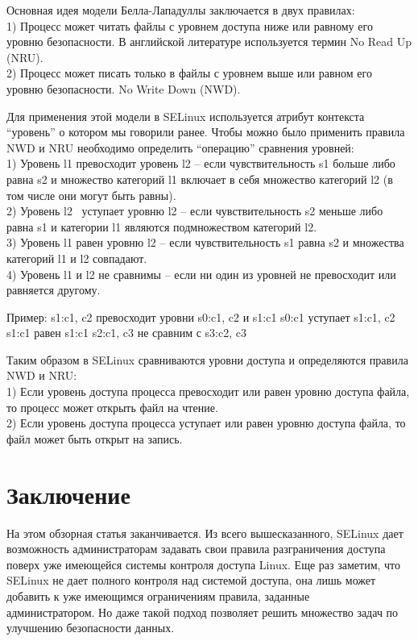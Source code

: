\documentclass{article}
\begin{document}
Основная идея модели Белла-Лападуллы заключается в двух правилах:\\
1) Процесс может читать файлы с уровнем доступа ниже или равному его уровню безопасности. В английской литературе используется термин No Read Up (NRU).\\
2) Процесс может писать только в файлы с уровнем выше или равном его уровню безопасности. No Write Down (NWD).

Для применения этой модели в SELinux используется атрибут контекста “уровень” о котором мы говорили ранее. Чтобы можно было применить правила NWD и NRU необходимо определить “операцию” сравнения уровней:\\
1) Уровень l1 превосходит уровень l2 – если чувствительность s1 больше либо равна s2 и множество категорий l1 включает в себя множество категорий l2 (в том числе они могут быть равны).\\
2) Уровень l2  уступает уровню l2 – если чувствительность s2 меньше либо равна s1 и категории l1 являются подмножеством категорий l2.\\
3) Уровень l1 равен уровню l2 – если чувствительность s1 равна s2 и множества категорий l1 и l2 совпадают.\\
4) Уровень l1 и l2 не сравнимы – если ни один из уровней не превосходит или равняется другому.

Пример:
s1:c1, c2 превосходит уровни s0:c1, c2 и s1:c1
s0:c1 уступает s1:c1, c2
s1:c1 равен s1:c1
s2:c1, c3 не сравним с s3:c2, c3

Таким образом в SELinux сравниваются уровни доступа и определяются правила NWD и NRU:\\
1) Если уровень доступа процесса превосходит или равен уровню доступа файла, то процесс может открыть файл на чтение.\\
2) Если уровень доступа процесса уступает или равен уровню доступа файла, то файл может быть открыт на запись.


\section{Заключение}

На этом обзорная статья заканчивается. Из всего вышесказанного, SELinux дает возможность администраторам задавать свои правила разграничения доступа поверх уже имеющейся системы контроля доступа Linux. Еще раз заметим, что SELinux не дает полного контроля над системой доступа, она лишь может добавить к уже имеющимся ограничениям правила, заданные\\ администратором. Но даже такой подход позволяет решить множество задач по улучшению безопасности данных.
\end{document}
